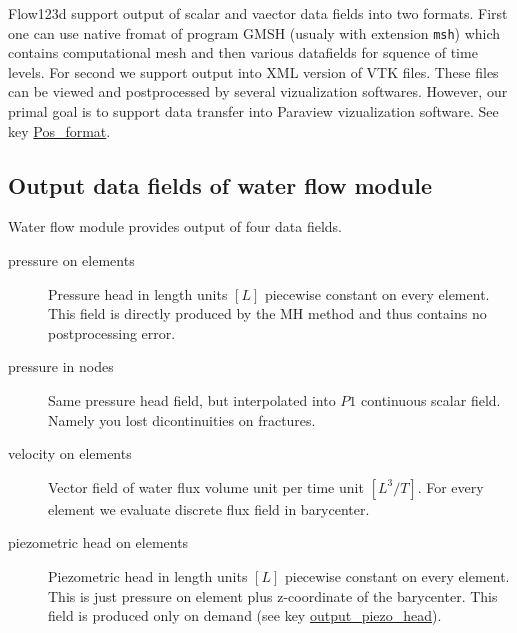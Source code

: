 %
%
%
%

\label{section_output}

Flow123d support output of scalar and vaector data fields into two formats. First one can use native fromat of program GMSH (usualy with extension \verb'msh')
which contains computational mesh and then various datafields for squence of time levels. For second we support output into XML version of VTK files. These files can be 
viewed and postprocessed by several vizualization softwares. However, our primal goal is to support data transfer into Paraview vizualization software.
See key \hyperlink{KeyOutFormat}{Pos\_format}. 

\subsection{Output data fields of water flow module}
Water flow module provides output of four data fields. 
\begin{description}
 \item[pressure on elements] Pressure head in length units $[L]$ piecewise constant on every element. This field is directly produced by the MH method and thus contains no postprocessing error.
 \item[pressure in nodes] Same pressure head field, but interpolated into $P1$ continuous scalar field. Namely you lost dicontinuities on fractures.
 \item[velocity on elements] Vector field of water flux volume unit per time unit $[L^3 / T]$. For every element we evaluate discrete flux field in barycenter.
 \item[piezometric head on elements] Piezometric head in length units $[L]$ piecewise constant on every element. This is just pressure on element  plus z-coordinate of the barycenter. This field is produced only on demand
 (see key \hyperlink{KeyPiezoHead}{output\_piezo\_head}).
\end{description}

